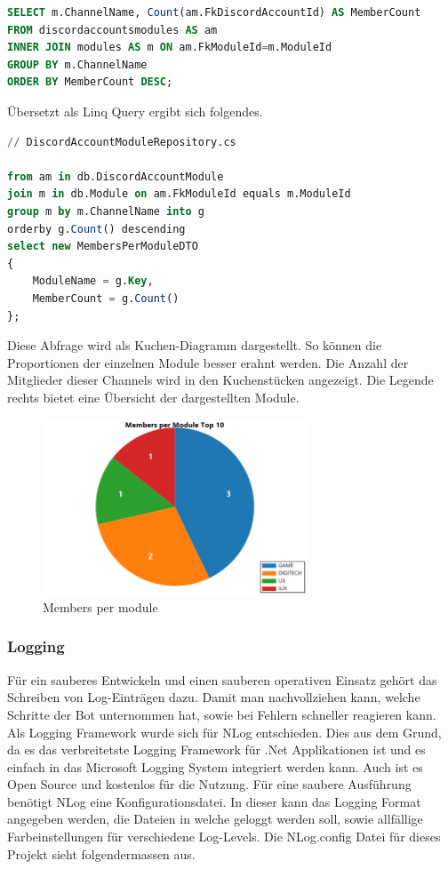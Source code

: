 \documentclass[a4paper, table]{article}
\begin{document}
\begin{lstlisting}[language=SQL]
SELECT m.ChannelName, Count(am.FkDiscordAccountId) AS MemberCount
FROM discordaccountsmodules AS am 
INNER JOIN modules AS m ON am.FkModuleId=m.ModuleId
GROUP BY m.ChannelName
ORDER BY MemberCount DESC;
\end{lstlisting}

Übersetzt als Linq Query ergibt sich folgendes.

\begin{lstlisting}[language=SQL]
// DiscordAccountModuleRepository.cs

from am in db.DiscordAccountModule
join m in db.Module on am.FkModuleId equals m.ModuleId
group m by m.ChannelName into g
orderby g.Count() descending
select new MembersPerModuleDTO
{
    ModuleName = g.Key,
    MemberCount = g.Count()
};
\end{lstlisting}

Diese Abfrage wird als Kuchen-Diagramm dargestellt. 
So können die Proportionen der einzelnen Module besser erahnt werden. 
Die Anzahl der Mitglieder dieser Channels wird in den Kuchenstücken angezeigt. 
Die Legende rechts bietet eine Übersicht der dargestellten Module.

\begin{figure}[h]
    \centering
    \includegraphics[width=0.7\textwidth]{img/membersPerModule.png}
    \caption{Members per module}
    \label{fig:members-per-module}
\end{figure}
\clearpage

\subsubsection{Logging}
Für ein sauberes Entwickeln und einen sauberen operativen Einsatz gehört das Schreiben von Log-Einträgen dazu. 
Damit man nachvollziehen kann, welche Schritte der Bot unternommen hat, sowie bei Fehlern schneller reagieren kann.\\
Als Logging Framework wurde sich für NLog entschieden.\autocite{noauthor_nlog_nodate}
Dies aus dem Grund, da es das verbreitetste Logging Framework für .Net Applikationen ist und es einfach in das Microsoft Logging System integriert werden kann. 
Auch ist es Open Source und kostenlos für die Nutzung. 
Für eine saubere Ausführung benötigt NLog eine Konfigurationsdatei. 
In dieser kann das Logging Format angegeben werden, die Dateien in welche geloggt werden soll, sowie allfällige Farbeinstellungen für verschiedene Log-Levels. 
Die NLog.config Datei für dieses Projekt sieht folgendermassen aus.
\end{document}
